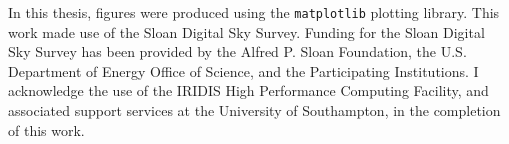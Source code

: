 \documentclass[a4paper, 11pt, twoside]{Thesis}  %
\begin{document}
{In this thesis, figures were produced using the {\tt matplotlib} 
plotting library. This work made use of the Sloan Digital Sky Survey.
Funding for the Sloan Digital Sky Survey has been provided by
the Alfred P. Sloan Foundation, the U.S. Department of Energy Office of
Science, and the Participating Institutions.
I acknowledge the use of the IRIDIS High Performance Computing 
Facility, and associated support services at the University of 
Southampton, in the completion of this work.
}

\clearpage

\pagestyle{plain}
\clearpage  %
\end{document}
